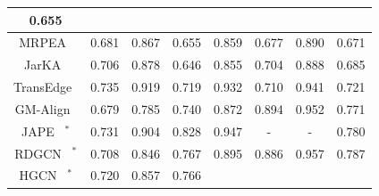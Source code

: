 {\begin{tabular}{@{}cccccccc@{}}
            0.655\\ 
            \midrule
          \multicolumn{1}{c|}{MRPEA~\cite{shi2019modeling}} &
            \multicolumn{1}{c}{0.681} &
            \multicolumn{1}{c|}{0.867} &
            \multicolumn{1}{c}{0.655} &
            \multicolumn{1}{c|}{0.859} &
            \multicolumn{1}{c}{0.677} &
            \multicolumn{1}{c|}{0.890} &
            0.671\\ 
            \midrule
          \multicolumn{1}{c|}{JarKA~\cite{chen2020jarka}} &
            \multicolumn{1}{c}{0.706} &
            \multicolumn{1}{c|}{0.878} &
            \multicolumn{1}{c}{0.646} &
            \multicolumn{1}{c|}{0.855} &
            \multicolumn{1}{c}{0.704} &
            \multicolumn{1}{c|}{0.888} &
            0.685\\ 
            \midrule
          \multicolumn{1}{c|}{TransEdge~\cite{sun2019transedge}} &
            \multicolumn{1}{c}{{0.735}} &
            \multicolumn{1}{c|}{{0.919}} &
            \multicolumn{1}{c}{{0.719}} &
            \multicolumn{1}{c|}{{0.932}} &
            \multicolumn{1}{c}{{0.710}} &
            \multicolumn{1}{c|}{{0.941}} &
            0.721\\ 
            \midrule
          \multicolumn{1}{c|}{GM-Align~\cite{xu2019cross-lingual}} &
            \multicolumn{1}{c}{0.679} &
            \multicolumn{1}{c|}{0.785} &
            \multicolumn{1}{c}{0.740} &
            \multicolumn{1}{c|}{0.872} &
            \multicolumn{1}{c}{0.894} &
            \multicolumn{1}{c|}{0.952} &
            0.771\\
            \midrule
          \multicolumn{1}{c|}{{JAPE~\cite{JAPE} $^*$}} &
            \multicolumn{1}{c}{0.731} &
            \multicolumn{1}{c|}{0.904} &
            \multicolumn{1}{c}{{0.828}} &
            \multicolumn{1}{c|}{0.947} &
            \multicolumn{1}{c}{-} &
            \multicolumn{1}{c|}{-} &
            0.780\\
          \midrule
          \multicolumn{1}{c|}{{RDGCN~\cite{wu2019relation} $^*$}} &
            \multicolumn{1}{c}{0.708} &
            \multicolumn{1}{c|}{0.846} &
            \multicolumn{1}{c}{0.767} &
            \multicolumn{1}{c|}{0.895} &
            \multicolumn{1}{c}{0.886} &
            \multicolumn{1}{c|}{0.957} &
            0.787\\
            \midrule
          \multicolumn{1}{c|}{{HGCN~\cite{wu2019jointly} $^*$}} &
            \multicolumn{1}{c}{0.720} &
            \multicolumn{1}{c|}{0.857} &
            \multicolumn{1}{c}{0.766} &

\end{tabular}}
